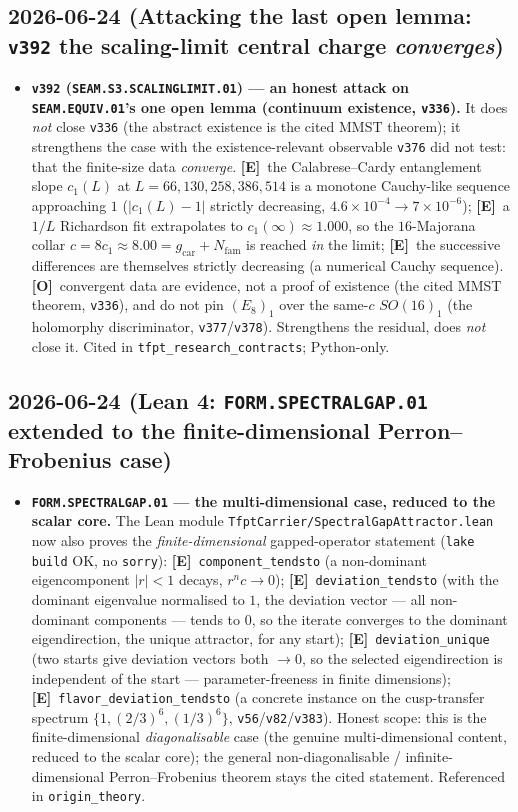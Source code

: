 \documentclass[11pt]{article}
\providecommand{\mE}{\textbf{[E]}}\providecommand{\mC}{\textbf{[C]}}
\providecommand{\mO}{\textbf{[O]}}\providecommand{\mX}{\textbf{[X]}}
\providecommand{\vref}[1]{\texttt{#1}}
\providecommand{\gcar}{g_{\mathrm{car}}}\providecommand{\Nfam}{N_{\mathrm{fam}}}
\begin{document}
\subsection*{2026-06-24 (Attacking the last open lemma: \texttt{v392} the scaling-limit central charge \emph{converges})}
\begin{itemize}
\item \textbf{\texttt{v392} (\texttt{SEAM.S3.SCALINGLIMIT.01}) --- an honest attack on \texttt{SEAM.EQUIV.01}'s one
open lemma (continuum existence, \vref{v336}).} It does \emph{not} close \vref{v336} (the abstract existence is the
cited MMST theorem); it strengthens the case with the existence-relevant observable \vref{v376} did not test: that
the finite-size data \emph{converge}. \mE\ the Calabrese--Cardy entanglement slope $c_1(L)$ at $L=66,130,258,386,514$
is a monotone Cauchy-like sequence approaching $1$ ($|c_1(L)-1|$ strictly decreasing, $4.6\times10^{-4}\to7\times10^{-6}$);
\mE\ a $1/L$ Richardson fit extrapolates to $c_1(\infty)\approx1.000$, so the $16$-Majorana collar $c=8c_1\approx8.00
=\gcar{+}\Nfam$ is reached \emph{in} the limit; \mE\ the successive differences are themselves strictly decreasing
(a numerical Cauchy sequence). \mO\ convergent data are evidence, not a proof of existence (the cited MMST theorem,
\vref{v336}), and do not pin $(E_8)_1$ over the same-$c$ $SO(16)_1$ (the holomorphy discriminator, \vref{v377}/\vref{v378}).
Strengthens the residual, does \emph{not} close it. Cited in \texttt{tfpt\_research\_contracts}; Python-only.
\end{itemize}

\subsection*{2026-06-24 (Lean 4: \texttt{FORM.SPECTRALGAP.01} extended to the finite-dimensional Perron--Frobenius case)}
\begin{itemize}
\item \textbf{\texttt{FORM.SPECTRALGAP.01} --- the multi-dimensional case, reduced to the scalar core.} The Lean
module \texttt{TfptCarrier/SpectralGapAttractor.lean} now also proves the \emph{finite-dimensional} gapped-operator
statement (\texttt{lake build} OK, no \texttt{sorry}): \mE\ \texttt{component\_tendsto} (a non-dominant eigencomponent
$|r|<1$ decays, $r^n c\to0$); \mE\ \texttt{deviation\_tendsto} (with the dominant eigenvalue normalised to $1$, the
deviation vector --- all non-dominant components --- tends to $0$, so the iterate converges to the dominant
eigendirection, the unique attractor, for any start); \mE\ \texttt{deviation\_unique} (two starts give deviation
vectors both $\to0$, so the selected eigendirection is independent of the start --- parameter-freeness in finite
dimensions); \mE\ \texttt{flavor\_deviation\_tendsto} (a concrete instance on the cusp-transfer spectrum
$\{1,(2/3)^6,(1/3)^6\}$, \vref{v56}/\vref{v82}/\vref{v383}). Honest scope: this is the finite-dimensional
\emph{diagonalisable} case (the genuine multi-dimensional content, reduced to the scalar core); the general
non-diagonalisable / infinite-dimensional Perron--Frobenius theorem stays the cited statement. Referenced in
\texttt{origin\_theory}.
\end{itemize}
\end{document}
